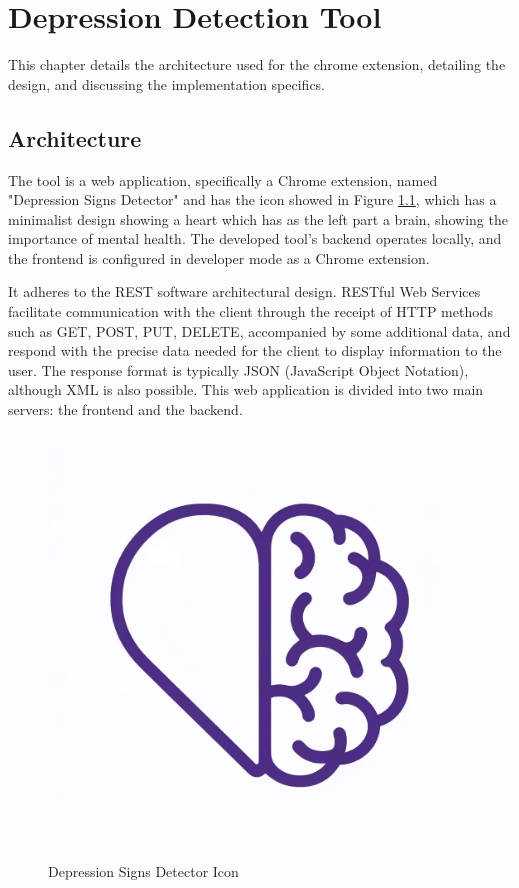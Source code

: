 \chapter{Depression Detection Tool}
\label{chap:ch5}

\quad This chapter details the architecture used for the chrome extension, detailing the design, and discussing the implementation specifics.

\section{Architecture}

\quad The tool is a web application, specifically a Chrome extension, named "Depression Signs Detector" and has the icon showed in Figure \ref{depressionsSignsDetectorIcon}, which has a minimalist design showing a heart which has as the left part a brain, showing the importance of mental health. The developed tool's backend operates locally, and the frontend is configured in developer mode as a Chrome extension.

It adheres to the REST software architectural design. RESTful Web Services facilitate communication with the client through the receipt of HTTP methods such as GET, POST, PUT, DELETE, accompanied by some additional data, and respond with the precise data needed for the client to display information to the user. The response format is typically JSON (JavaScript Object Notation), although XML is also possible. This web application is divided into two main servers: the frontend and the backend.

\begin{figure}[htbp]
	\centering
		\includegraphics[scale=0.1]{LaTeX Bachelor Thesis Depression Signs Detection/figures/icon1024.png}
	\caption{Depression Signs Detector Icon}
	\label{depressionsSignsDetectorIcon}
\end{figure}

